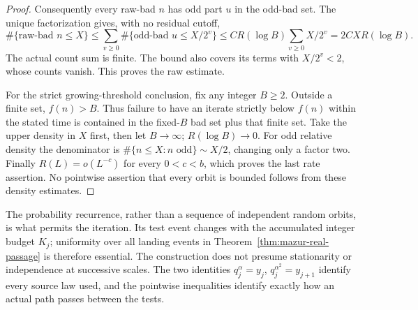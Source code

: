 \documentclass[11pt]{article}
\theoremstyle{remark}\newtheorem{remark}[proposition]{Remark}
\begin{document}
\begin{proof}
Consequently every raw-bad \(n\) has odd part \(u\) in the odd-bad
set. The unique factorization gives, with no residual cutoff,
\[
 \#\{\text{raw-bad }n\le X\}
 \le\sum_{v\ge0}\#\{\text{odd-bad }u\le X/2^v\}
 \le C R(\log B)\sum_{v\ge0}X/2^v
 =2CX R(\log B).
\]
The actual count sum is finite. The bound also covers its terms with
\(X/2^v<2\), whose counts vanish. This proves the raw estimate.

For the strict growing-threshold conclusion, fix any integer \(B\ge2\).
Outside a finite set, \(f(n)>B\). Thus failure to have an iterate
strictly below \(f(n)\) within the stated time is contained in the
fixed-\(B\) bad set plus that finite set. Take the upper density in
\(X\) first, then let \(B\to\infty\); \(R(\log B)\to0\).
For odd relative density the denominator is
\(\#\{n\le X:n\text{ odd}\}\sim X/2\), changing only a factor two.
Finally \(R(L)=o(L^{-c})\) for every \(0<c<b\), which proves the
last rate assertion. No pointwise assertion that every orbit is
bounded follows from these density estimates.
\end{proof}

The probability recurrence, rather than a sequence of independent
random orbits, is what permits the iteration. Its test event changes
with the accumulated integer budget \(K_j\); uniformity over all
landing events in Theorem~\ref{thm:mazur-real-passage} is therefore
essential. The construction does not presume stationarity or
independence at successive scales. The two identities
\(q_j^\alpha=y_j\), \(q_j^{\alpha^2}=y_{j+1}\) identify every source
law used, and the pointwise inequalities identify exactly how an
actual path passes between the tests.

\begin{center}
\end{center}
\end{document}
